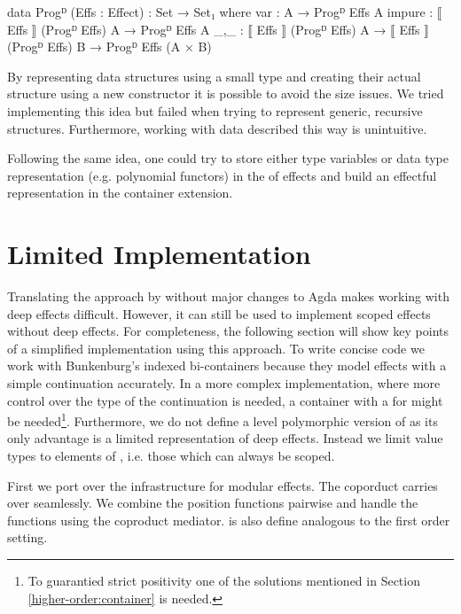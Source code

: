 \begin{code}
data Progᴰ (Effs : Effect) : Set → Set₁ where
  var     : A → Progᴰ Effs A
  impure  : ⟦ Effs ⟧ (Progᴰ Effs) A → Progᴰ Effs A
  _,_     : ⟦ Effs ⟧ (Progᴰ Effs) A → ⟦ Effs ⟧ (Progᴰ Effs) B → Progᴰ Effs (A × B)
\end{code}
By representing data structures using a small type and creating their actual
structure using a new  constructor it is possible to avoid
the size issues.
We tried implementing this idea but failed when trying to represent generic,
recursive structures.
Furthermore, working with data described this way is unintuitive.

Following the same idea, one could try to store either type variables or data
type representation (e.g. polynomial functors) in the  of
effects and build an effectful representation in the container extension.


\section{Limited Implementation}
\label{higher-order:limited-impl}

Translating the approach by \textcite{DBLP:conf/haskell/WuSH14} without major
changes to Agda makes working with deep effects difficult.
However, it can still be used to implement scoped effects without deep effects.
For completeness, the following section will show key points of a simplified
implementation using this approach.
To write concise code we work with Bunkenburg's indexed bi-containers
because they model effects with a simple continuation accurately.
In a more complex implementation, where more control over the type of the
continuation is needed, a container with a  for 
might be needed\footnote{To guarantied strict positivity one of the solutions
  mentioned in Section \ref{higher-order:container} is needed.}.
Furthermore, we do not define a level polymorphic version of 
as its only advantage is a limited representation of deep effects.
Instead we limit value types to elements of , i.e. those which
can always be scoped.

First we port over the infrastructure for modular effects.
The coporduct carries over seamlessly.
We combine the position functions pairwise and handle the 
functions using the coproduct mediator.
 is also define analogous to the first order
setting.


